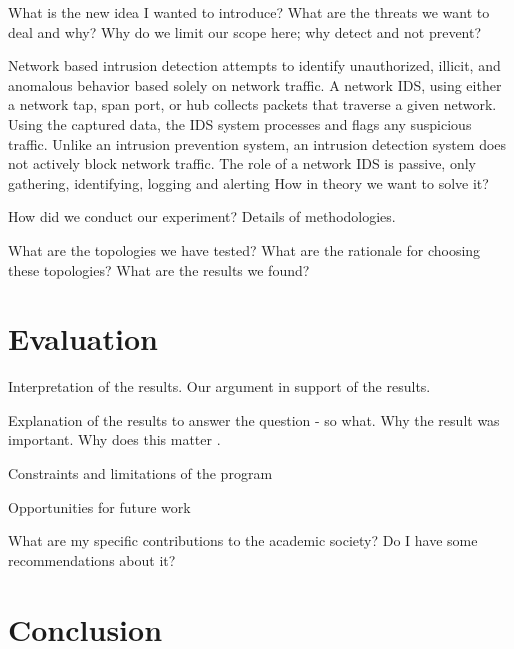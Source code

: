 \documentclass[conference,man]{IEEEtran}
\begin{document}
  
What is the new idea I wanted to introduce?
What are the threats we want to deal and why?
Why do we limit our scope here; why detect and not prevent?

Network based intrusion detection attempts to identify unauthorized, illicit, and anomalous behavior based solely on network traffic. A network IDS, using either a network tap, span port, or hub collects packets that traverse a given network. Using the captured data, the IDS system processes and flags any suspicious traffic. Unlike an intrusion prevention system, an intrusion detection system does not actively block network traffic. The role of a network IDS is passive, only gathering, identifying, logging and alerting
How in theory we want to solve it?

How did we conduct our experiment?
Details of methodologies.

What are the topologies we have tested? 
What are the rationale for choosing these topologies?
What are the results we found?

%
%

\section{Evaluation}
\label{sec:eval}
Interpretation of the results.
Our argument in support of the results.

Explanation of the results to answer the question - so what.
Why the result was important.
Why does this matter .

Constraints and limitations of the program

Opportunities for future work

What are my specific contributions to the academic society?
Do I have some recommendations about it?


\section{Conclusion}
\end{document}
